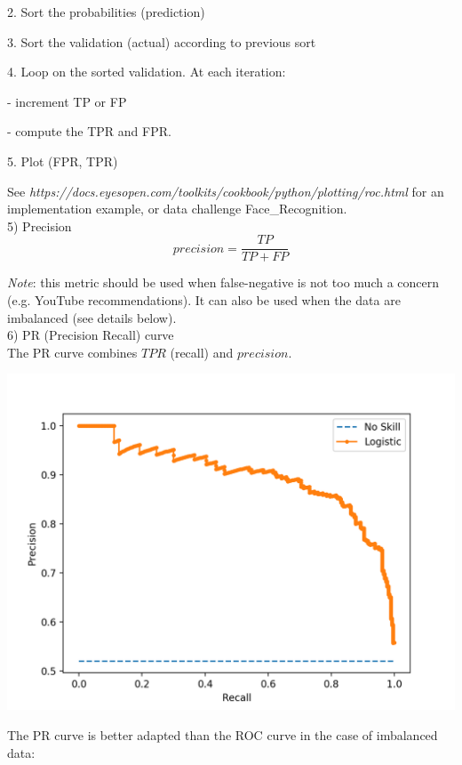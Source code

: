 2. Sort the probabilities (prediction)

3. Sort the validation (actual) according to previous sort

4. Loop on the sorted validation. At each iteration:

- increment TP or FP

- compute the TPR and FPR.

5. Plot (FPR, TPR)

\vspace{5mm}

See \textit{https://docs.eyesopen.com/toolkits/cookbook/python/plotting/roc.html} for an implementation example, or data challenge Face\_Recognition. \\

5) Precision \\

$$precision = \frac{TP}{TP + FP}$$

\textit{Note}: this metric should be used when false-negative is not too much a concern (e.g. YouTube recommendations). It can also be used when the data are imbalanced (see details below). \\

6) PR (Precision Recall) curve \\

The PR curve combines $TPR$ (recall) and $precision$.

\begin{center}
\includegraphics[scale=0.5]{PR_curve.png}
\end{center}

The PR curve is better adapted than the ROC curve in the case of imbalanced data: \\

